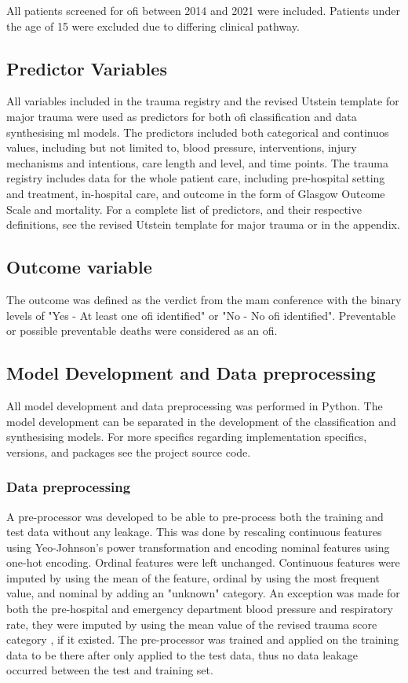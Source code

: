 \documentclass[12pt, letterpaper]{article}
\begin{document}
All patients screened for \acrshort{ofi} between 2014 and 2021 were included. Patients under the age of 15 were excluded due to differing clinical pathway.

\subsection{Predictor Variables}
All variables included in the trauma registry and the revised Utstein template for major trauma were used as predictors for both \acrshort{ofi} classification and data synthesising \acrshort{ml} models. The predictors included both categorical and continuos values, including but not limited to, blood pressure, interventions, injury mechanisms and intentions, care length and level, and time points. The trauma registry includes data for the whole patient care, including pre-hospital setting and treatment, in-hospital care, and outcome in the form of Glasgow Outcome Scale and mortality. For a complete list of predictors, and their respective definitions, see the revised Utstein template for major trauma \cite{ringdal_utstein_2008} or  in the appendix.

\subsection{Outcome variable}
The outcome was defined as the verdict from the \acrshort{mam} conference with the binary levels of "Yes - At least one \acrshort{ofi} identified" or "No - No \acrshort{ofi} identified". Preventable or possible preventable deaths were considered as an \acrshort{ofi}.

\subsection{Model Development and Data preprocessing}
All model development and data preprocessing was performed in Python. The model development can be separated in the development of the classification and synthesising models. For more specifics regarding implementation specifics, versions, and packages see the project source code.

\subsubsection*{Data preprocessing}
A pre-processor was developed to be able to pre-process both the training and test data without any leakage. This was done by rescaling continuous features using Yeo-Johnson's power transformation \cite{yeo_new_2000} and encoding nominal features using one-hot encoding. Ordinal features were left unchanged. Continuous features were imputed by using the mean of the feature, ordinal by using the most frequent value, and nominal by adding an "unknown" category. An exception was made for both the pre-hospital and emergency department blood pressure and respiratory rate, they were imputed by using the mean value of the revised trauma score category \cite{ringdal_utstein_2008}, if it existed. The pre-processor was trained and applied on the training data to be there after only applied to the test data, thus no data leakage occurred between the test and training set.
\end{document}
